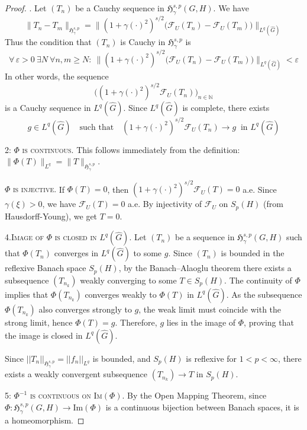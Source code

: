 \documentclass[11pt,a4paper]{article}
\theoremstyle{definition}
\newcommand{\F}{\mathcal{F}}
\newcommand{\Ghat}{\widehat{G}}
\begin{document}
\begin{proof}

. Let $(T_n)$ be a Cauchy sequence in $\mathfrak{H}_\gamma^{s,p}(G,H)$. We have
\[
\|T_n - T_m\|_{\mathfrak{H}_\gamma^{s,p}}
  = \big\|(1+\gamma(\cdot)^2)^{s/2}\big(\F_U(T_n)-\F_U(T_m)\big)\big\|_{L^q(\widehat G)}
\]
Thus the condition that $(T_n)$ is Cauchy in $\mathfrak{H}_\gamma^{s,p}$ is 
\[
\forall\,\varepsilon>0\ \exists N\ \forall n,m\ge N:\ 
\big\|(1+\gamma(\cdot)^2)^{s/2}\big(\F_U(T_n)-\F_U(T_m)\big)\big\|_{L^q(\widehat G)}<\varepsilon
\]
In other words, the sequence
\[
\big((1+\gamma(\cdot)^2)^{s/2}\F_U(T_n)\big)_{n\in\mathbb N}
\]
is a Cauchy sequence in $L^q(\widehat G)$. Since $L^q(\widehat G)$ is complete, there exists
\[
g\in L^q(\widehat G)\quad\text{such that}\quad
(1+\gamma(\cdot)^2)^{s/2}\F_U(T_n)\to g \ \text{ in }L^q(\widehat G)
\]

\bigskip

\textsc{2: $\Phi$ is continuous.} This follows immediately from the definition: $\|\Phi(T)\|_{L^q} = \|T\|_{\mathfrak{H}_\gamma^{s,p}}$.

\bigskip

\textsc{$\Phi$ is injective.} If $\Phi(T) = 0$, then $(1 + \gamma(\cdot)^2)^{s/2} \F_U(T) = 0$ a.e. Since $\gamma(\xi) > 0$, we have $\F_U(T) = 0$ a.e. By injectivity of $\F_U$ on $S_p(H)$ (from Hausdorff-Young), we get $T = 0$.

\bigskip

\textsc{4.Image of $\Phi$ is closed in $L^q(\Ghat)$.}  
Let $(T_n)$ be a sequence in $\mathfrak{H}_\gamma^{s,p}(G,H)$ such that $\Phi(T_n)$ converges in $L^q(\hat{G})$ to some $g$. Since $(T_n)$ is bounded in the reflexive Banach space $S_p(H)$, by the Banach--Alaoglu theorem there exists a subsequence $(T_{n_k})$ weakly converging to some $T \in S_p(H)$. The continuity of $\Phi$ implies that $\Phi(T_{n_k})$ converges weakly to $\Phi(T)$ in $L^q(\hat{G})$. As the subsequence $\Phi(T_{n_k})$ also converges strongly to $g$, the weak limit must coincide with the strong limit, hence $\Phi(T) = g$. Therefore, $g$ lies in the image of $\Phi$, proving that the image is closed in $L^q(\hat{G})$.

Since $||T_n||_{\mathfrak{H}^{s,p}_\gamma} = ||f_n||_{L^q}$ is bounded, and $S_p(H)$ is reflexive  for $1 < p < \infty$, there exists a weakly convergent subsequence $(T_{n_k}) \rightarrow T \text{  in } S_p(H)$.


\bigskip

\textsc{5: $\Phi^{-1}$ is continuous on $\text{Im}(\Phi)$.} By the Open Mapping Theorem, since $\Phi: \mathfrak{H}_\gamma^{s,p}(G,H) \to \text{Im}(\Phi)$ is a continuous bijection between Banach spaces, it is a homeomorphism.
\end{proof}
\end{document}

